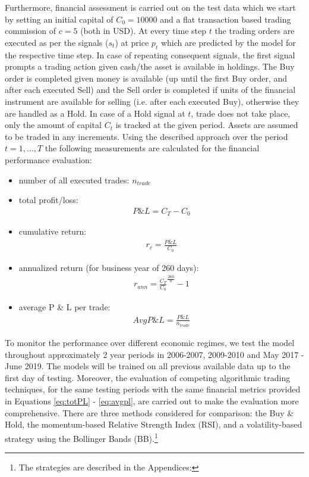 \documentclass[11pt, a4paper]{article}
\begin{document}
Furthermore, financial assessment is carried out on the test data which we start by setting an initial capital of $C_0 = 10000$ and a flat transaction based trading commission of $c = 5$ (both in USD). At every time step $t$ the trading orders are executed as per the signals ($s_t$) at price $p_t$ which are predicted by the model for the respective time step.
In case of repeating consequent signals, the first signal prompts a trading action given cash/the asset is available in holdings. The Buy order is completed given money is available (up until the first Buy order, and after each executed Sell) and the Sell order is completed if units of the financial instrument are available for selling (i.e. after each executed Buy), otherwise they are handled as a Hold. In case of a Hold signal at $t$, trade does not take place, only the amount of capital $C_t$ is tracked at the given period.
Assets are assumed to be traded in any increments. Using the described approach over the period $t=1, \dots, T$ the following measurements are calculated for the financial performance evaluation:

\begin{itemize}
    \item number of all executed trades: $n_{trade}$
    \item total profit/loss: 
    \begin{align}
        \label{eq:totPL}
            P\& L = C_T - C_0
    \end{align}
    \item cumulative return: 
    \begin{align}
        \label{eq:cumret}
            r_c = \frac{P \& L}{C_0}
    \end{align}
    \item annualized return (for business year of 260 days): 
    \begin{align}
        \label{eq:annualized}
            r_{ann} = \frac{C_T}{C_0}^{\frac{260}{n}}-1
    \end{align}
    \item average P \& L per trade:
    \begin{align}
        \label{eq:avgpl}
        AvgP \& L = \frac{P \& L}{n_{trade}}
    \end{align}
\end{itemize}

To monitor the performance over different economic regimes, we test the model throughout approximately 2 year periods in 2006-2007, 2009-2010 and May 2017 - June 2019. The models will be trained on all previous available data up to the first day of testing. 
Moreover, the evaluation of competing algorithmic trading techniques, for the same testing periods with the same financial metrics provided in Equations \ref{eq:totPL} - \ref{eq:avgpl}, are carried out to make the evaluation more comprehensive.
There are three methods considered for comparison: the Buy \& Hold, the momentum-based Relative Strength Index (RSI), and a volatility-based strategy using the Bollinger Bands (BB).\footnote{The strategies are described in the Appendices: }
\end{document}
